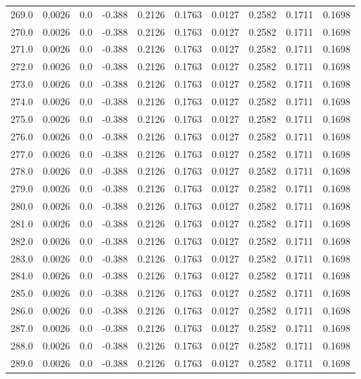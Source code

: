 \begin{longtable}{lrrrrrrrrr}
269.0 & 0.0026 & 0.0 & -0.388 & 0.2126 & 0.1763 & 0.0127 & 0.2582 & 0.1711 & 0.1698 \\
270.0 & 0.0026 & 0.0 & -0.388 & 0.2126 & 0.1763 & 0.0127 & 0.2582 & 0.1711 & 0.1698 \\
271.0 & 0.0026 & 0.0 & -0.388 & 0.2126 & 0.1763 & 0.0127 & 0.2582 & 0.1711 & 0.1698 \\
272.0 & 0.0026 & 0.0 & -0.388 & 0.2126 & 0.1763 & 0.0127 & 0.2582 & 0.1711 & 0.1698 \\
273.0 & 0.0026 & 0.0 & -0.388 & 0.2126 & 0.1763 & 0.0127 & 0.2582 & 0.1711 & 0.1698 \\
274.0 & 0.0026 & 0.0 & -0.388 & 0.2126 & 0.1763 & 0.0127 & 0.2582 & 0.1711 & 0.1698 \\
275.0 & 0.0026 & 0.0 & -0.388 & 0.2126 & 0.1763 & 0.0127 & 0.2582 & 0.1711 & 0.1698 \\
276.0 & 0.0026 & 0.0 & -0.388 & 0.2126 & 0.1763 & 0.0127 & 0.2582 & 0.1711 & 0.1698 \\
277.0 & 0.0026 & 0.0 & -0.388 & 0.2126 & 0.1763 & 0.0127 & 0.2582 & 0.1711 & 0.1698 \\
278.0 & 0.0026 & 0.0 & -0.388 & 0.2126 & 0.1763 & 0.0127 & 0.2582 & 0.1711 & 0.1698 \\
279.0 & 0.0026 & 0.0 & -0.388 & 0.2126 & 0.1763 & 0.0127 & 0.2582 & 0.1711 & 0.1698 \\
280.0 & 0.0026 & 0.0 & -0.388 & 0.2126 & 0.1763 & 0.0127 & 0.2582 & 0.1711 & 0.1698 \\
281.0 & 0.0026 & 0.0 & -0.388 & 0.2126 & 0.1763 & 0.0127 & 0.2582 & 0.1711 & 0.1698 \\
282.0 & 0.0026 & 0.0 & -0.388 & 0.2126 & 0.1763 & 0.0127 & 0.2582 & 0.1711 & 0.1698 \\
283.0 & 0.0026 & 0.0 & -0.388 & 0.2126 & 0.1763 & 0.0127 & 0.2582 & 0.1711 & 0.1698 \\
284.0 & 0.0026 & 0.0 & -0.388 & 0.2126 & 0.1763 & 0.0127 & 0.2582 & 0.1711 & 0.1698 \\
285.0 & 0.0026 & 0.0 & -0.388 & 0.2126 & 0.1763 & 0.0127 & 0.2582 & 0.1711 & 0.1698 \\
286.0 & 0.0026 & 0.0 & -0.388 & 0.2126 & 0.1763 & 0.0127 & 0.2582 & 0.1711 & 0.1698 \\
287.0 & 0.0026 & 0.0 & -0.388 & 0.2126 & 0.1763 & 0.0127 & 0.2582 & 0.1711 & 0.1698 \\
288.0 & 0.0026 & 0.0 & -0.388 & 0.2126 & 0.1763 & 0.0127 & 0.2582 & 0.1711 & 0.1698 \\
289.0 & 0.0026 & 0.0 & -0.388 & 0.2126 & 0.1763 & 0.0127 & 0.2582 & 0.1711 & 0.1698 \\

\end{longtable}
